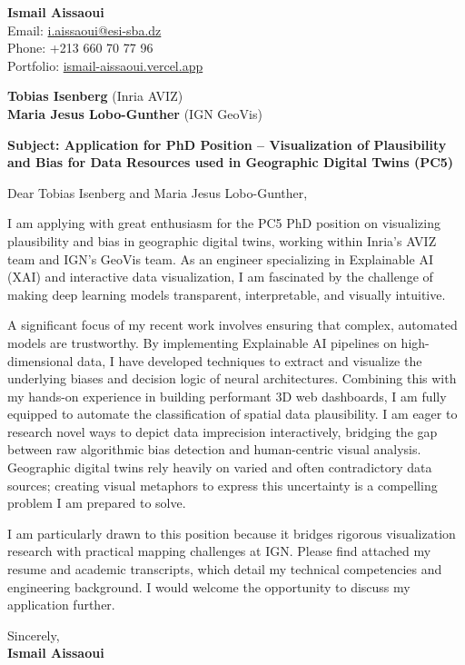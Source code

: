 \documentclass[11pt,a4paper]{article}
\begin{document}
\thispagestyle{empty}

\begin{flushright}
\textbf{Ismail Aissaoui} \\
Email: \href{mailto:i.aissaoui@esi-sba.dz}{i.aissaoui@esi-sba.dz} \\
Phone: +213 660 70 77 96 \\
Portfolio: \href{https://ismail-aissaoui.vercel.app}{ismail-aissaoui.vercel.app}
\end{flushright}

\vspace{1em}

\begin{flushleft}
\textbf{Tobias Isenberg} (Inria AVIZ) \\
\textbf{Maria Jesus Lobo-Gunther} (IGN GeoVis)
\end{flushleft}

\vspace{1em}
\noindent\textbf{Subject: Application for PhD Position -- Visualization of Plausibility and Bias for Data Resources used in Geographic Digital Twins (PC5)}
\vspace{1em}

\noindent Dear Tobias Isenberg and Maria Jesus Lobo-Gunther,

\vspace{1em}
\noindent
I am applying with great enthusiasm for the PC5 PhD position on visualizing plausibility and bias in geographic digital twins, working within Inria's AVIZ team and IGN's GeoVis team. As an engineer specializing in Explainable AI (XAI) and interactive data visualization, I am fascinated by the challenge of making deep learning models transparent, interpretable, and visually intuitive.

\vspace{0.5em}
\noindent
A significant focus of my recent work involves ensuring that complex, automated models are trustworthy. By implementing Explainable AI pipelines on high-dimensional data, I have developed techniques to extract and visualize the underlying biases and decision logic of neural architectures. Combining this with my hands-on experience in building performant 3D web dashboards, I am fully equipped to automate the classification of spatial data plausibility. I am eager to research novel ways to depict data imprecision interactively, bridging the gap between raw algorithmic bias detection and human-centric visual analysis. Geographic digital twins rely heavily on varied and often contradictory data sources; creating visual metaphors to express this uncertainty is a compelling problem I am prepared to solve.

\vspace{0.5em}
\noindent
I am particularly drawn to this position because it bridges rigorous visualization research with practical mapping challenges at IGN. Please find attached my resume and academic transcripts, which detail my technical competencies and engineering background. I would welcome the opportunity to discuss my application further.

\vspace{1.5em}
\noindent
Sincerely, \\[0.5em]
\textbf{Ismail Aissaoui}
\end{document}
